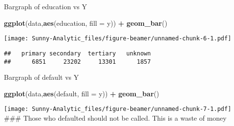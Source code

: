 \documentclass[ignorenonframetext,]{beamer}
\newenvironment{Shaded}{\begin{snugshade}}{\end{snugshade}}
\newcommand{\DataTypeTok}[1]{\textcolor[rgb]{0.13,0.29,0.53}{#1}}
\newcommand{\KeywordTok}[1]{\textcolor[rgb]{0.13,0.29,0.53}{\textbf{#1}}}
\newcommand{\NormalTok}[1]{#1}
\newcommand{\OperatorTok}[1]{\textcolor[rgb]{0.81,0.36,0.00}{\textbf{#1}}}
\newcommand{\StringTok}[1]{\textcolor[rgb]{0.31,0.60,0.02}{#1}}
\begin{document}
\begin{frame}[fragile]{Bargraph of education vs Y}
\protect\hypertarget{bargraph-of-education-vs-y}{}

\begin{Shaded}
\begin{Highlighting}[]
\KeywordTok{ggplot}\NormalTok{(data,}\KeywordTok{aes}\NormalTok{(education, }\DataTypeTok{fill =}\NormalTok{ y)) }\OperatorTok{+}\StringTok{ }\KeywordTok{geom_bar}\NormalTok{()}
\end{Highlighting}
\end{Shaded}

\texttt{[image: Sunny-Analytic\_files/figure-beamer/unnamed-chunk-6-1.pdf]}

\begin{Shaded}
\end{Shaded}

\begin{verbatim}
##   primary secondary  tertiary   unknown 
##      6851     23202     13301      1857
\end{verbatim}

\end{frame}

\begin{frame}[fragile]{Bargraph of default vs Y}
\protect\hypertarget{bargraph-of-default-vs-y}{}

\begin{Shaded}
\begin{Highlighting}[]
\KeywordTok{ggplot}\NormalTok{(data,}\KeywordTok{aes}\NormalTok{(default, }\DataTypeTok{fill =}\NormalTok{ y)) }\OperatorTok{+}\StringTok{ }\KeywordTok{geom_bar}\NormalTok{()}
\end{Highlighting}
\end{Shaded}

\texttt{[image: Sunny-Analytic\_files/figure-beamer/unnamed-chunk-7-1.pdf]}
\#\#\# Those who defaulted should not be called. This is a waste of
money

\end{frame}
\end{document}
